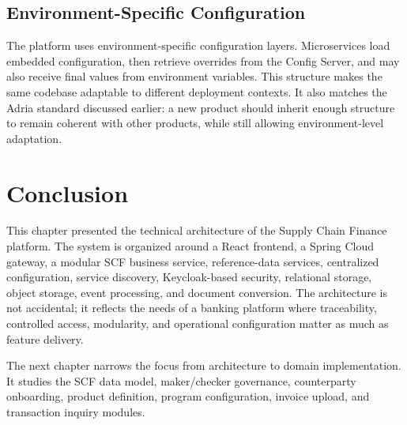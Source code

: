 \subsection{Environment-Specific Configuration}
\label{subsec:environment_config}

The platform uses environment-specific configuration layers. Microservices load embedded configuration, then retrieve overrides from the Config Server, and may also receive final values from environment variables. This structure makes the same codebase adaptable to different deployment contexts. It also matches the Adria standard discussed earlier: a new product should inherit enough structure to remain coherent with other products, while still allowing environment-level adaptation.

\section{Conclusion}
\label{sec:ch2_conclusion}

This chapter presented the technical architecture of the Supply Chain Finance platform. The system is organized around a React frontend, a Spring Cloud gateway, a modular SCF business service, reference-data services, centralized configuration, service discovery, Keycloak-based security, relational storage, object storage, event processing, and document conversion. The architecture is not accidental; it reflects the needs of a banking platform where traceability, controlled access, modularity, and operational configuration matter as much as feature delivery.

The next chapter narrows the focus from architecture to domain implementation. It studies the SCF data model, maker/checker governance, counterparty onboarding, product definition, program configuration, invoice upload, and transaction inquiry modules.
